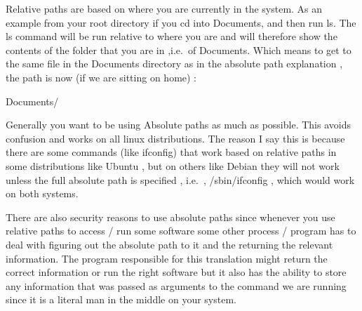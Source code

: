 Relative paths are based on where you are currently in the system. As an example
from your root directory if you cd into Documents, and then run ls. The ls
command will be run relative to where you are and will therefore show the
contents of the folder that you are in ,i.e.\ of Documents. Which means to get
to the same file in the Documents directory as in the absolute path explanation
, the path is now (if we are sitting on home) :

Documents/

Generally you want to be using Absolute paths as much as possible. This avoids
confusion and works on all linux distributions. The reason I say this is because
there are some commands (like ifconfig) that work based on relative paths in
some distributions like Ubuntu , but on others like Debian they will not work
unless the full absolute path is specified , i.e.\ , /sbin/ifconfig , which
would work on both systems.

There are also security reasons to use absolute paths since whenever you use
relative paths to access / run some software some other process / program has to
deal with figuring out the absolute path to it and the returning the relevant
information. The program responsible for this translation might return the
correct information or run the right software but it also has the ability to
store any information that was passed as arguments to the command we are running
since it is a literal man in the middle on your system.

\sectionend






